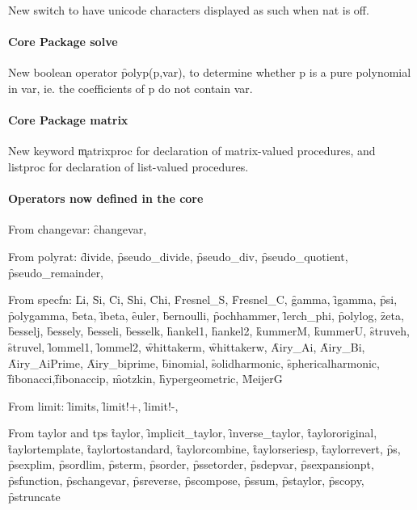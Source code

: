 New switch  to have unicode characters
displayed as such when nat is off.

\paragraph*{Core Package solve}

New boolean operator \f{polyp}(p,var), to determine whether p is a pure polynomial
in var, ie. the coefficients of p do not contain var.

\paragraph*{Core Package matrix}

New keyword \k{matrixproc} for declaration of matrix-valued procedures, and listproc for declaration of list-valued procedures.

\paragraph*{Operators now defined in the \REDUCE core}

From changevar: \f{changevar},

From polyrat: \f{divide}, \f{pseudo\_divide}, \f{pseudo\_div}, \f{pseudo\_quotient}, \f{pseudo\_remainder},

From specfn: 
\f{Li}, \f{Si}, \f{Ci}, \f{Shi}, \f{Chi},
\f{Fresnel\_S}, \f{Fresnel\_C},
\f{gamma}, \f{igamma}, \f{psi}, \f{polygamma}, \f{beta}, \f{ibeta},
\f{euler},
\f{bernoulli}, \f{pochhammer}, \f{lerch\_phi}, \f{polylog}, \f{zeta}, 
\f{besselj},
\f{bessely},
\f{besseli},
\f{besselk},
\f{hankel1},
\f{hankel2},
\f{kummerM},
\f{kummerU},
\f{struveh},
\f{struvel},
\f{lommel1},
\f{lommel2},
\f{whittakerm},
\f{whittakerw},
\f{Airy\_Ai},
\f{Airy\_Bi},
\f{Airy\_AiPrime},
\f{Airy\_biprime},
\f{binomial},
\f{solidharmonic},
\f{sphericalharmonic},
\f{fibonacci},\f{fibonaccip},
\f{motzkin},
\f{hypergeometric}, \f{MeijerG}

From limit: 
\f{limits}, \f{limit!+}, \f{limit!-},

From taylor and tps
\f{taylor}, \f{implicit\_taylor}, \f{inverse\_taylor},
\f{taylororiginal}, \f{taylortemplate}, \f{taylortostandard}, \f{taylorcombine}, \f{taylorseriesp},
\f{taylorrevert},
\f{ps}, 
\f{psexplim}, \f{psordlim}, \f{psterm}, \f{psorder}, \f{pssetorder}, \f{psdepvar}, \f{psexpansionpt},
\f{psfunction}, \f{pschangevar}, \f{psreverse}, \f{pscompose}, \f{pssum}, \f{pstaylor}, \f{pscopy}, \f{pstruncate}

